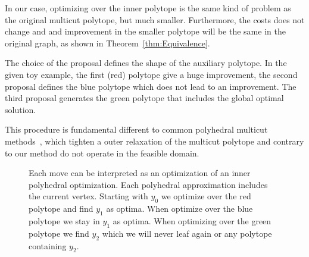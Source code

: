 \documentclass[10pt,twocolumn,letterpaper]{article}
\newtheorem{theorem}{Theorem}
\newtheorem{remark}{Remark}
\theoremstyle{definition}
\newcommand{\OR}{\textrm{ or }}
\begin{document}
In our case, optimizing over the inner polytope is the same kind of problem as the original multicut polytope, but much smaller.
Furthermore, the costs does not change and and improvement in the smaller polytope will 
be the same in the original graph, as shown in Theorem~\ref{thm:Equivalence}.

The choice of the proposal defines the shape of the auxiliary polytope. 
In the given toy example, the first (red) polytope give a huge improvement, the second proposal
defines the blue polytope which does not lead to an improvement. 
The third proposal generates the green polytope that includes the global optimal solution.

This procedure is fundamental different to common polyhedral multicut methods~\cite{kappes_2011_emmcvpr,kappes_2013_arxiv}, 
which tighten a outer relaxation of the multicut polytope and contrary to our method do not operate in the feasible domain. 



\begin{figure}
\centering

\caption{Each move can be interpreted as an optimization of an inner polyhedral optimization.
Each polyhedral approximation includes the current vertex. Starting with $y_0$ we optimize over the red polytope 
and find $y_1$ as optima. When optimize over the blue polytope we stay in $y_1$ as optima.
When optimizing over the green polytope we find $y_2$ which we will never leaf again or any polytope containing $y_2$. 
}
\label{fig:polyheadral}
\end{figure}







\end{document}
